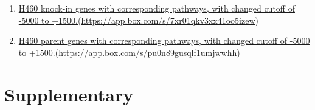 \documentclass[11pt]{article}
\begin{document}
 \begin{enumerate}

	\item \href{https://app.box.com/s/7xr01qkv3xx41oo5izew}{H460 knock-in genes with corresponding pathways, with changed cutoff of -5000 to +1500.(https://app.box.com/s/7xr01qkv3xx41oo5izew)} 
%	
	\item \href{https://app.box.com/s/pu0n89gusqlf1umjwwhh}{H460 parent genes with corresponding pathways,  with changed cutoff of -5000 to +1500.(https://app.box.com/s/pu0n89gusqlf1umjwwhh)}
\end{enumerate}

 
\section*{Supplementary}  
 
 
 
 
 
\end{document}

